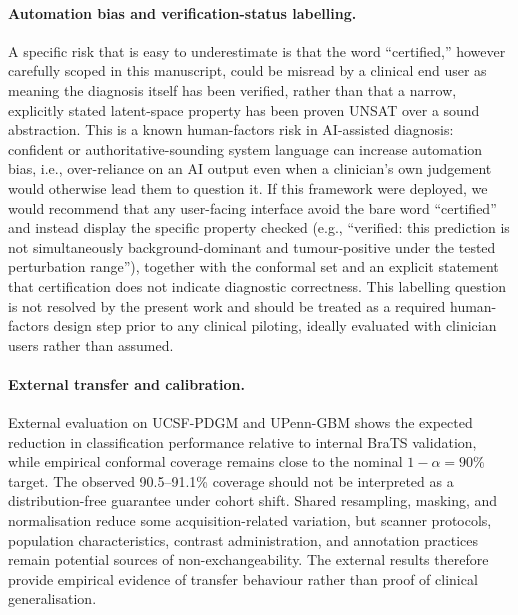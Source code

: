 \documentclass[preprint,11pt]{elsarticle}
\begin{document}
\paragraph{Automation bias and verification-status labelling.}
A specific risk that is easy to underestimate is that the word ``certified,'' however carefully scoped in this manuscript, could be misread by a clinical end user as meaning the diagnosis itself has been verified, rather than that a narrow, explicitly stated latent-space property has been proven UNSAT over a sound abstraction. This is a known human-factors risk in AI-assisted diagnosis: confident or authoritative-sounding system language can increase automation bias, i.e., over-reliance on an AI output even when a clinician's own judgement would otherwise lead them to question it. If this framework were deployed, we would recommend that any user-facing interface avoid the bare word ``certified'' and instead display the specific property checked (e.g., ``verified: this prediction is not simultaneously background-dominant and tumour-positive under the tested perturbation range''), together with the conformal set and an explicit statement that certification does not indicate diagnostic correctness. This labelling question is not resolved by the present work and should be treated as a required human-factors design step prior to any clinical piloting, ideally evaluated with clinician users rather than assumed.

\paragraph{External transfer and calibration.}
External evaluation on UCSF-PDGM and UPenn-GBM shows the expected reduction in classification performance relative to internal BraTS validation, while empirical conformal coverage remains close to the nominal $1-\alpha=90\%$ target. The observed 90.5--91.1\% coverage should not be interpreted as a distribution-free guarantee under cohort shift. Shared resampling, masking, and normalisation reduce some acquisition-related variation, but scanner protocols, population characteristics, contrast administration, and annotation practices remain potential sources of non-exchangeability. The external results therefore provide empirical evidence of transfer behaviour rather than proof of clinical generalisation.
\end{document}
